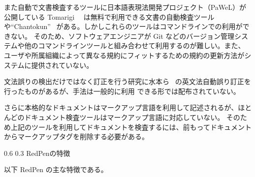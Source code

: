 \documentclass[a4j,twocolumn]{jarticle}
\makeatletter
\def\section{\@startsection{section}{1}{\z@}%
   {0.6\Cvs}%
   {0.3\Cvs}%
   {\reset@font\fontsize{10.5pt}{0pt}\bfseries}}
\makeatother
\begin{document}
また自動で文書検査するツールに日本語表現法開発プロジェクト（PaWeL）が公開している Tomarigi~\cite{tomarigi}~\cite{tomarigi-paper}
は無料で利用できる文書の自動検査ツールや``Chantokun''~\cite{chantokun} がある。しかしこれらのツールはコマンドラインでの利用ができない。
そのため、ソフトウェアエンジニアが Git などのバージョン管理システムや他のコマンドラインツールと組み合わせて利用するのが難しい。また、
ユーザや所属組織によって異なる規約にフィットするための規約の更新方法がシステムに提供されていない。 

文法誤りの検出だけではなく訂正を行う研究に水本ら~\cite{mizumoto12english} の英文法自動誤り訂正を行ったものがあるが、手法は一般的に利用
できる形では配布されていない。

さらに本格的なドキュメントはマークアップ言語を利用して記述されるが、ほとんどのドキュメント検査ツールはマークアップ言語に対応していない。
そのため上記のツールを利用してドキュメントを検査するには、前もってドキュメントからマークアップタグを削除する必要がある。

\section{RedPenの特徴}

以下 RedPen の主な特徴である。
\end{document}
